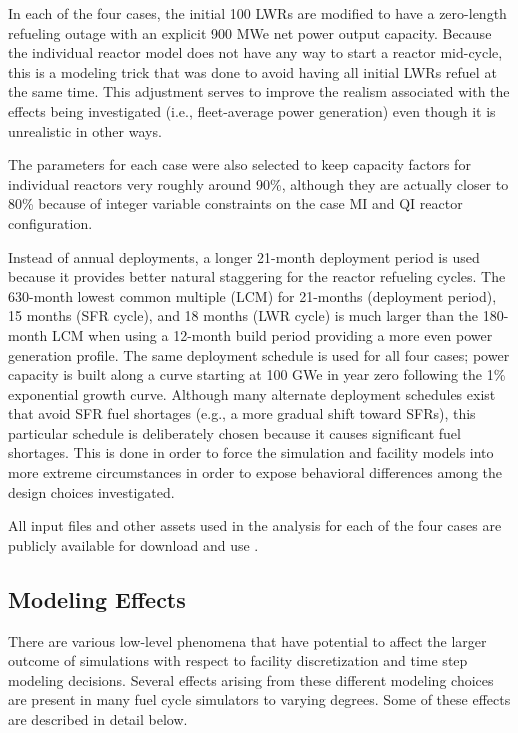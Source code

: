 \documentclass{style}
\begin{document}
In each of the four cases, the initial 100 LWRs are modified to have a
zero-length refueling outage with an explicit 900 MWe net power output
capacity.  Because the individual reactor model does not have any way to start
a reactor mid-cycle, this is a modeling trick that was done to avoid having
all initial LWRs refuel at the same time.  This adjustment serves to improve
the realism associated with the effects being investigated (i.e., fleet-average
power generation) even though it is unrealistic in other ways.

The parameters for each case were also selected to keep capacity factors for
individual reactors very roughly around 90\%, although they are actually
closer to 80\% because of integer variable constraints on the case MI and QI
reactor configuration.  

Instead of annual deployments, a longer 21-month deployment period is used
because it provides better natural staggering for the reactor refueling
cycles. The 630-month lowest common multiple (LCM) for 21-months (deployment
period), 15 months (SFR cycle), and 18 months (LWR cycle) is much larger than
the 180-month LCM when using a 12-month build period providing a more even
power generation profile.  The same deployment schedule is used for all four
cases; power capacity is built along a curve starting at 100 GWe in year zero
following the 1\% exponential growth curve.  Although many alternate
deployment schedules exist that avoid SFR fuel shortages (e.g., a more gradual
shift toward SFRs), this particular schedule is deliberately chosen because it
causes significant fuel shortages.  This is done in order to force the
simulation and facility models into more extreme circumstances in order to
expose behavioral differences among the design choices investigated.

All input files and other assets used in the analysis for each of the four
cases are publicly available for download and use \cite{Carlsen2015}.

\subsection{Modeling Effects}

There are various low-level phenomena that have potential to affect the larger
outcome of simulations with respect to facility discretization and time step
modeling decisions. Several effects arising from these different modeling
choices are present in many fuel cycle simulators to varying degrees.  Some of
these effects are described in detail below.
\end{document}
